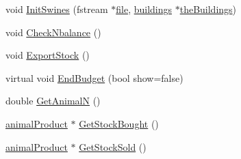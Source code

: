 \begin{DoxyCompactItemize}
\item 
void \hyperlink{classswine_stock_a53e9eabc6dbdd5b9a95d8aef104b3152}{InitSwines} (fstream $\ast$\hyperlink{classbase_a3af52ee9891719d09b8b19b42450b6f6}{file}, \hyperlink{classbuildings}{buildings} $\ast$\hyperlink{_new_main_8cpp_a8802bc0a0e45fa6db05d71b3e4c39680}{theBuildings})
\item 
void \hyperlink{classswine_stock_ae916f8f1c9d3996c7708352a1ab8ab27}{CheckNbalance} ()
\item 
void \hyperlink{classswine_stock_afeb3c33e9c241c408aabf971a1666196}{ExportStock} ()
\item 
virtual void \hyperlink{classswine_stock_a473b8e850355273ad6cf37b36ae31e14}{EndBudget} (bool show=false)
\item 
double \hyperlink{classswine_stock_af9621b75adfaf8ab25752627dd344479}{GetAnimalN} ()
\item 
\hyperlink{classanimal_product}{animalProduct} $\ast$ \hyperlink{classswine_stock_a5ef49c2bbc4df37f13cec1d1d452ea3a}{GetStockBought} ()
\item 
\hyperlink{classanimal_product}{animalProduct} $\ast$ \hyperlink{classswine_stock_a84a354508bd5989c1d8fe53209292f63}{GetStockSold} ()
\end{DoxyCompactItemize}
